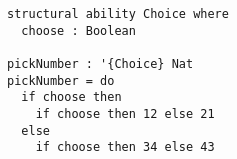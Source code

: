 \begin{algorithm}

\begin{verbatim}
structural ability Choice where
  choose : Boolean
  
pickNumber : '{Choice} Nat
pickNumber = do
  if choose then
    if choose then 12 else 21
  else
    if choose then 34 else 43
\end{verbatim}

\caption{Definition and usage of Choice effect in Unison %
\label{alg-eff:choice-effect}}
\end{algorithm}